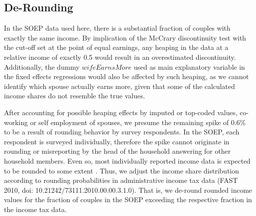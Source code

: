 \documentclass[a4paper,11pt]{scrartcl}
\begin{document}
\pagebreak
\begin{appendix}
	\renewcommand*\thetable{\Alph{section}.\arabic{table}}
	\renewcommand*\thefigure{\Alph{section}.\arabic{figure}}

	\section{De-Rounding}\label{derounding}
	\setcounter{table}{0}
	\setcounter{figure}{0}

	In the SOEP data used here, there is a substantial fraction of couples with exactly the same income. By implication of the McCrary discontinuity test with the cut-off set at the point of equal earnings, any heaping in the data at a relative income of exactly 0.5 would result in an overestimated discontinuity. Additionally, the dummy $wifeEarnsMore$ used as main explanatory variable in the fixed effects regressions would also be affected by such heaping, as we cannot identify which spouse actually earns more, given that some of the calculated income shares do not resemble the true values.

	After accounting for possible heaping effects by imputed or top-coded values, co-working or self employment of spouses, we presume the remaining spike of 0.6\% to be a result of rounding behavior by survey respondents. In the SOEP, each respondent is surveyed individually, therefore the spike cannot originate in rounding or misreporting by the head of the household answering for other household members. Even so, most individually reported income data is expected to be rounded to some extent \citep{drechsler2015beat, zinn2016statistical}. Thus, we adjust the income share distribution according to rounding probabilities in administrative income tax data (FAST 2010, doi: 10.21242/73111.2010.00.00.3.1.0). That is, we de-round rounded income values for the fraction of couples in the SOEP exceeding the respective fraction in the income tax data.


\end{appendix}
\end{document}
